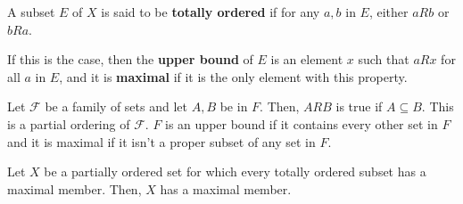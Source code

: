 \documentclass{article}
\begin{document}
\begin{definition}
A subset $E$ of $X$ is said to be \textbf{totally ordered} if for any $a,b$ in $E$, either $aRb$ or $bRa$. 

If this is the case, then the \textbf{upper bound} of $E$ is an element $x$ such that $aRx$ for all $a$ in $E$, and it is \textbf{maximal} if it is the only element with this property. 
\end{definition}

\begin{definition}
Let $\mathcal{F}$ be a family of sets and let $A,B$ be in $F$. Then, $ARB$ is true if $A\subseteq B$. This is a partial ordering of $\mathcal{F}$. $F$ is an upper bound if it contains every other set in $F$ and it is maximal if it isn't a proper subset of any set in $F$. 
\end{definition}

\begin{lemma}
Let $X$ be a partially ordered set for which every totally ordered subset has a maximal member. Then, $X$ has a maximal member. 
\end{lemma}
\end{document}
